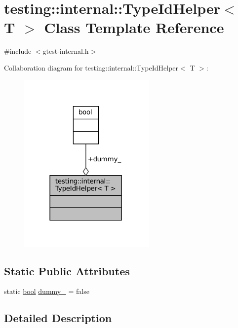 \hypertarget{classtesting_1_1internal_1_1TypeIdHelper}{}\section{testing\+:\+:internal\+:\+:Type\+Id\+Helper$<$ T $>$ Class Template Reference}
\label{classtesting_1_1internal_1_1TypeIdHelper}


{\ttfamily \#include $<$gtest-\/internal.\+h$>$}



Collaboration diagram for testing\+:\+:internal\+:\+:Type\+Id\+Helper$<$ T $>$\+:
\nopagebreak
\begin{figure}[H]
\begin{center}
\leavevmode
\includegraphics[width=190pt]{classtesting_1_1internal_1_1TypeIdHelper__coll__graph}
\end{center}
\end{figure}
\subsection*{Static Public Attributes}
\begin{DoxyCompactItemize}
\item 
static \hyperlink{classbool}{bool} \hyperlink{classtesting_1_1internal_1_1TypeIdHelper_a372268b1520d965d0bdf01ebad3d270e}{dummy\+\_\+} = false
\end{DoxyCompactItemize}


\subsection{Detailed Description}

